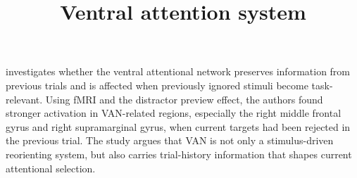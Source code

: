 \documentclass[a4paper]{article}
\title{Ventral attention system}
\date{}
\begin{document}
    \maketitle
    \cite{scalf-2014-trial-history-effects-in-the-ventral-attentional-network}  investigates whether the ventral attentional network preserves information from previous trials and is affected when previously ignored stimuli become task-relevant. Using fMRI and the distractor preview effect, the authors found stronger activation in VAN-related regions, especially the right middle frontal gyrus and right supramarginal gyrus, when current targets had been rejected in the previous trial. The study argues that VAN is not only a stimulus-driven reorienting system, but also carries trial-history information that shapes current attentional selection.
    
    
\end{document}
